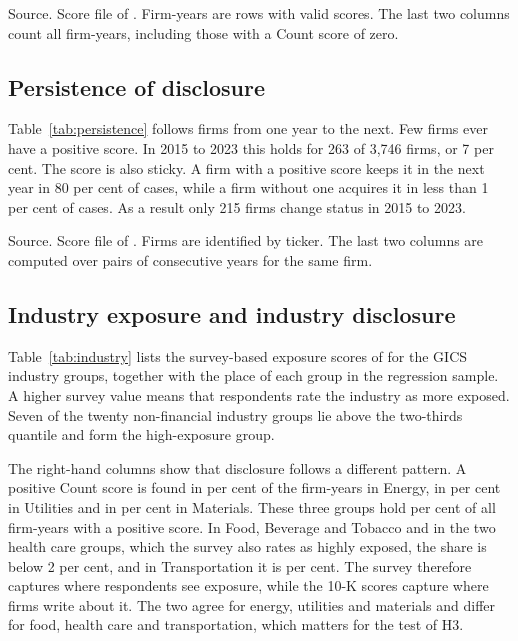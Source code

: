 \documentclass[12pt,a4paper]{article}
\newcommand{\tablenote}[1]{\par\smallskip\begin{minipage}{\linewidth}\footnotesize\setstretch{1.05}#1\end{minipage}}
\newcommand{\widetable}[1]{\resizebox{\ifdim\width>\linewidth\linewidth\else\width\fi}{!}{}}
\begin{document}
\begin{table}[!htbp]
\centering\small
\caption{Biodiversity scores in 10-K filings by period}\label{tab:period}
\widetable{tables/tab_scores_by_period}
\tablenote{Source. Score file of \citet{giglio2026}. Firm-years are rows with valid scores. The last two columns count all firm-years, including those with a Count score of zero.}
\end{table}

\subsection{Persistence of disclosure}

Table~\ref{tab:persistence} follows firms from one year to the next. Few firms ever have a positive score. In 2015 to 2023 this holds for 263 of 3,746 firms, or 7 per cent. The score is also sticky. A firm with a positive score keeps it in the next year in 80 per cent of cases, while a firm without one acquires it in less than 1 per cent of cases. As a result only 215 firms change status in 2015 to 2023.

\begin{table}[!htbp]
\centering\small
\caption{Persistence of the Count score}\label{tab:persistence}
\widetable{tables/tab_persistence}
\tablenote{Source. Score file of \citet{giglio2026}. Firms are identified by ticker. The last two columns are computed over pairs of consecutive years for the same firm.}
\end{table}

\subsection{Industry exposure and industry disclosure}

Table~\ref{tab:industry} lists the survey-based exposure scores of \citet{giglio2026} for the GICS industry groups, together with the place of each group in the regression sample. A higher survey value means that respondents rate the industry as more exposed. Seven of the twenty non-financial industry groups lie above the two-thirds quantile and form the high-exposure group.

The right-hand columns show that disclosure follows a different pattern. A positive Count score is found in \pctEnergy{} per cent of the firm-years in Energy, in \pctUtilities{} per cent in Utilities and in \pctMaterials{} per cent in Materials. These three groups hold \pctTopThree{} per cent of all firm-years with a positive score. In Food, Beverage and Tobacco and in the two health care groups, which the survey also rates as highly exposed, the share is below 2 per cent, and in Transportation it is \pctTransport{} per cent. The survey therefore captures where respondents see exposure, while the 10-K scores capture where firms write about it. The two agree for energy, utilities and materials and differ for food, health care and transportation, which matters for the test of H3.
\end{document}
